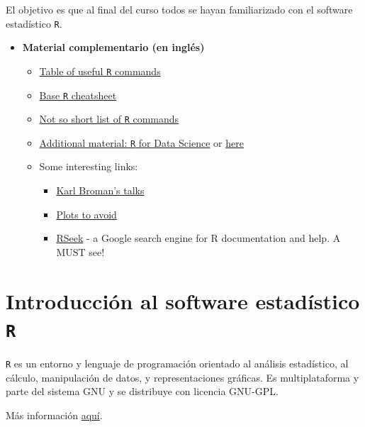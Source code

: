 \documentclass[]{book}
\begin{document}
El objetivo es que al final del curso todos se hayan familiarizado con
el software estadístico \texttt{R}.

\begin{itemize}
\item
  \textbf{Material complementario (en inglés)}

  \begin{itemize}
  \item
    \href{https://www.calvin.edu/~scofield/courses/m143/materials/RcmdsFromClass.pdf}{Table
    of useful \texttt{R} commands}
  \item
    \href{https://www.rstudio.com/wp-content/uploads/2016/10/r-cheat-sheet-3.pdf}{Base
    \texttt{R} cheatsheet}
  \item
    \href{http://www.webpages.uidaho.edu/~stevel/251/comR.pdf}{Not so
    short list of \texttt{R} commands}
  \item
    \href{http://r4ds.had.co.nz/}{Additional material: \texttt{R} for
    Data Science} or \href{http://courses.had.co.nz/}{here}
  \item
    Some interesting links:

    \begin{itemize}
    \item
      \href{http://kbroman.org/pages/talks.html}{Karl Broman's talks}
    \item
      \href{http://genomicsclass.github.io/book/pages/plots_to_avoid.html}{Plots
      to avoid}
    \item
      \href{http://rseek.org/}{RSeek} - a Google search engine for R
      documentation and help. A MUST see!
    \end{itemize}
  \end{itemize}
\end{itemize}

\chapter{\texorpdfstring{Introducción al software estadístico
\texttt{R}}{Introducción al software estadístico R}}\label{intro}

\texttt{R} es un entorno y lenguaje de programación orientado al
análisis estadístico, al cálculo, manipulación de datos, y
representaciones gráficas. Es multiplataforma y parte del sistema GNU y
se distribuye con licencia GNU-GPL.

Más información
\href{https://es.wikipedia.org/wiki/R_(lenguaje_de_programaci\%C3\%B3n)}{aquí}.
~
\end{document}
